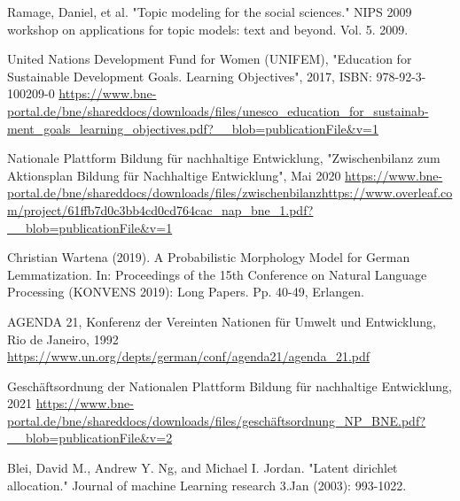\documentclass[letterpaper]{article}
\begin{document}
\begin{thebibliography}{xxx}
     Ramage, Daniel, et al. "Topic modeling for the social sciences." NIPS 2009 workshop on applications for topic models: text and beyond. Vol. 5. 2009.
    
     United Nations Development Fund for Women (UNIFEM), "Education for Sustainable Development Goals. Learning Objectives", 2017, ISBN: 978-92-3-100209-0
        \url{https://www.bne-portal.de/bne/shareddocs/downloads/files/unesco_education_for_sustainab-ment_goals_learning_objectives.pdf?__blob=publicationFile&v=1}
    
     Nationale Plattform Bildung für nachhaltige Entwicklung, "Zwischenbilanz zum Aktionsplan Bildung für Nachhaltige Entwicklung", Mai 2020
        \url{https://www.bne-portal.de/bne/shareddocs/downloads/files/zwischenbilanzhttps://www.overleaf.com/project/61ffb7d0c3bb4cd0cd764cac_nap_bne_1.pdf?__blob=publicationFile&v=1}
   
     Christian Wartena (2019). A Probabilistic Morphology Model for German Lemmatization. In: Proceedings of the 15th Conference on Natural Language Processing (KONVENS 2019): Long Papers. Pp. 40-49, Erlangen.
    
     AGENDA 21, Konferenz der Vereinten Nationen für Umwelt und Entwicklung, Rio de Janeiro, 1992
        \url{https://www.un.org/depts/german/conf/agenda21/agenda_21.pdf}
    
     Geschäftsordnung der Nationalen Plattform Bildung für nachhaltige Entwicklung, 2021
        \url{https://www.bne-portal.de/bne/shareddocs/downloads/files/geschäftsordnung_NP_BNE.pdf?__blob=publicationFile&v=2}
        
     Blei, David M., Andrew Y. Ng, and Michael I. Jordan. "Latent dirichlet allocation." Journal of machine Learning research 3.Jan (2003): 993-1022.

\end{thebibliography}
\end{document}
